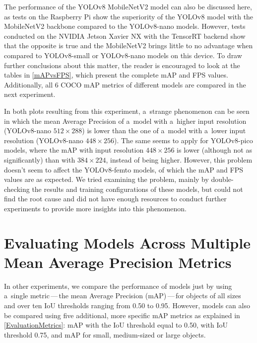 The performance of the YOLOv8 MobileNetV2 model can also be discussed here, as
tests on the Raspberry Pi show the superiority of the YOLOv8 model with the
MobileNetV2 backbone compared to the YOLOv8-nano models. However, tests
conducted on the NVIDIA Jetson Xavier NX with the TensorRT backend show that the
opposite is true and the MobileNetV2 brings little to no advantage when compared
to YOLOv8-small or YOLOv8-nano models on this device. To draw further
conclusions about this matter, the reader is encouraged to look at the tables in
\autoref{mAPvsFPS}, which present the complete mAP and FPS values. Additionally,
all 6 COCO mAP metrics of different models are compared in the next experiment.

In both plots resulting from this experiment, a~strange phenomenon can be seen
in which the mean Average Precision of a~model with a~higher input
resolution (YOLOv8-nano $512 \times 288$) is lower than the one of a~model
with a~lower input resolution (YOLOv8-nano $448 \times 256$). The same seems to apply for
YOLOv8-pico models, where the mAP with input resolution $448 \times 256$ is
lower (although not as significantly) than with $384 \times 224$, instead of
being higher. However, this problem doesn't seem to affect the YOLOv8-femto
models, of which the mAP and FPS values are as expected. We tried examining the
problem, mainly by double-checking the results and training configurations of
these models, but could not find the root cause and did not have enough
resources to conduct further experiments to provide more insights into this
phenomenon.









\section{Evaluating Models Across Multiple Mean Average Precision Metrics}

In other experiments, we compare the performance of models just by
using a~single metric\,---\,the mean Average Precision (mAP)\,---\,for objects of all
sizes and over ten IoU thresholds ranging from \num{0.50} to \num{0.95}.
However, models can also be compared using five additional, more specific mAP
metrics as explained in \autoref{EvaluationMetrics}: mAP with the IoU
threshold equal to \num{0.50}, with IoU threshold \num{0.75}, and mAP for small,
medium-sized or large objects.

